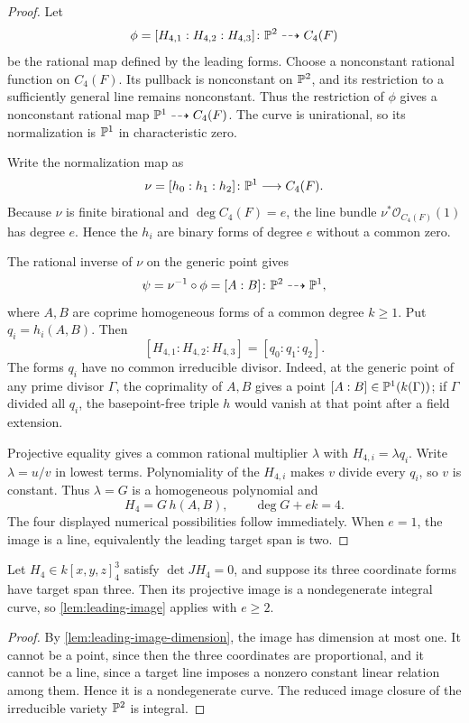 \documentclass[11pt,reqno]{amsart}
\begin{document}
\begin{proof}
Let
\[
\phi=[H_{4,1}:H_{4,2}:H_{4,3}]\colon\mathbb P^2\dashrightarrow C_4(F)
\]
be the rational map defined by the leading forms.  Choose a nonconstant
rational function on \(C_4(F)\).  Its pullback is nonconstant on \(\mathbb P^2\),
and its restriction to a sufficiently general line remains nonconstant.
Thus the restriction of \(\phi\) gives a nonconstant rational map
\(\mathbb P^1\dashrightarrow C_4(F)\).  The curve is unirational, so its
normalization is \(\mathbb P^1\) in characteristic zero.

Write the normalization map as
\[
\nu=[h_0:h_1:h_2]\colon\mathbb P^1\longrightarrow C_4(F).
\]
Because \(\nu\) is finite birational and \(\deg C_4(F)=e\), the line bundle
\(\nu^*\mathcal O_{C_4(F)}(1)\) has degree \(e\).  Hence the \(h_i\) are
binary forms of degree \(e\) without a common zero.

The rational inverse of \(\nu\) on the generic point gives
\[
\psi=\nu^{-1}\circ\phi=[A:B]\colon\mathbb P^2\dashrightarrow\mathbb P^1,
\]
where \(A,B\) are coprime homogeneous forms of a common degree \(k\ge1\).
Put \(q_i=h_i(A,B)\).  Then
\[
[H_{4,1}:H_{4,2}:H_{4,3}]=[q_0:q_1:q_2].
\]
The forms \(q_i\) have no common irreducible divisor.  Indeed, at the generic
point of any prime divisor \(\Gamma\), the coprimality of \(A,B\) gives a
point \([A:B]\in\mathbb P^1(k(\Gamma))\); if \(\Gamma\) divided all \(q_i\), the
basepoint-free triple \(h\) would vanish at that point after a field
extension.

Projective equality gives a common rational multiplier \(\lambda\) with
\(H_{4,i}=\lambda q_i\).  Write \(\lambda=u/v\) in lowest terms.  Polynomiality
of the \(H_{4,i}\) makes \(v\) divide every \(q_i\), so \(v\) is constant.
Thus \(\lambda=G\) is a homogeneous polynomial and
\[
H_4=G\,h(A,B),\qquad \deg G+ek=4.
\]
The four displayed numerical possibilities follow immediately.  When
\(e=1\), the image is a line, equivalently the leading target span is two.
\end{proof}

\begin{corollary}
\label{cor:span-three-curve-entry}
Let \(H_4\in k[x,y,z]_4^3\) satisfy \(\det JH_4=0\), and suppose its three
coordinate forms have target span three.  Then its projective image is a
nondegenerate integral curve, so \cref{lem:leading-image} applies with
\(e\ge2\).
\end{corollary}

\begin{proof}
By \cref{lem:leading-image-dimension}, the image has dimension at most one.
It cannot be a point, since then the three coordinates are proportional, and
it cannot be a line, since a target line imposes a nonzero constant linear
relation among them.  Hence it is a nondegenerate curve.  The reduced image
closure of the irreducible variety \(\mathbb P^2\) is integral.
\end{proof}
\end{document}
